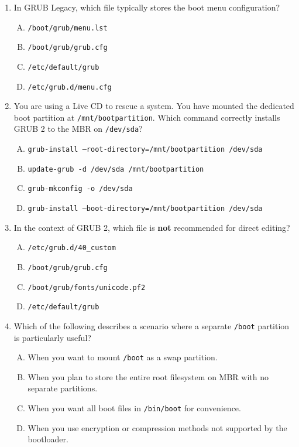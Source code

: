 \documentclass[a4paper]{report}
\begin{document}
\begin{enumerate}[1.]
    \item In GRUB Legacy, which file typically stores the boot menu configuration?  
    \begin{enumerate}[A)]
        \item \texttt{/boot/grub/menu.lst}  
        \item \texttt{/boot/grub/grub.cfg}  
        \item \texttt{/etc/default/grub}  
        \item \texttt{/etc/grub.d/menu.cfg}  
    \end{enumerate}

    \item You are using a Live CD to rescue a system. You have mounted the dedicated boot partition at \texttt{/mnt/bootpartition}. Which command correctly installs GRUB 2 to the MBR on \texttt{/dev/sda}?  
    \begin{enumerate}[A)]
        \item \texttt{grub-install --root-directory=/mnt/bootpartition /dev/sda}  
        \item \texttt{update-grub -d /dev/sda /mnt/bootpartition}  
        \item \texttt{grub-mkconfig -o /dev/sda}  
        \item \texttt{grub-install --boot-directory=/mnt/bootpartition /dev/sda}  
    \end{enumerate}

    \item In the context of GRUB 2, which file is \textbf{not} recommended for direct editing?  
    \begin{enumerate}[A)]
        \item \texttt{/etc/grub.d/40\_custom}  
        \item \texttt{/boot/grub/grub.cfg}  
        \item \texttt{/boot/grub/fonts/unicode.pf2}  
        \item \texttt{/etc/default/grub}  
    \end{enumerate}

    \item Which of the following describes a scenario where a separate \texttt{/boot} partition is particularly useful?  
    \begin{enumerate}[A)]
        \item When you want to mount \texttt{/boot} as a swap partition.  
        \item When you plan to store the entire root filesystem on MBR with no separate partitions.  
        \item When you want all boot files in \texttt{/bin/boot} for convenience.  
        \item When you use encryption or compression methods not supported by the bootloader.  
    \end{enumerate}


\end{enumerate}
\end{document}

